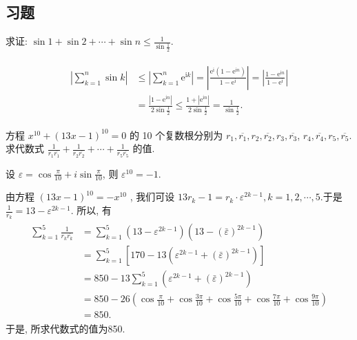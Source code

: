 \subsection{习题}
\begin{exercise}
	求证: $\sin 1+\sin 2+\cdots+\sin n \leqslant \frac{1}{\sin \frac{1}{2}}$.
\end{exercise}
\begin{solution}
	\begin{align*}
		\begin{aligned}
			\left|\sum_{k=1}^n \sin k\right| & \leqslant\left|\sum_{k=1}^n \mathrm{e}^{\mathrm{i} k}\right|=\left|\frac{\mathrm{e}^{\mathrm{i}}\left(1-\mathrm{e}^{\mathrm{i} n}\right)}{1-\mathrm{e}^{\mathrm{i}}}\right|=\left|\frac{1-\mathrm{e}^{\mathrm{i} n}}{1-\mathrm{e}^{\mathrm{i}}}\right| \\
			                                 & =\frac{\left|1-\mathrm{e}^{\mathrm{i} n}\right|}{2 \sin \frac{1}{2}} \leqslant \frac{1+\left|\mathrm{e}^{\mathrm{i} n}\right|}{2 \sin \frac{1}{2}}=\frac{1}{\sin \frac{1}{2}} .
		\end{aligned}
	\end{align*}
\end{solution}

\begin{exercise}
	方程 $x^{10}+(13 x-1)^{10}=0$ 的 10 个复数根分别为 $r_1, \overline{r_1}, r_2, \overline{r_2}, r_3, \overline{r_3}$, $r_4, \overline{r_4}, r_5, \overline{r_5}$. 求代数式 $\frac{1}{r_1 \overline{r_1}}+\frac{1}{r_2 \overline{r_2}}+\cdots+\frac{1}{r_5 \overline{r_5}}$ 的值.
\end{exercise}
\begin{solution}
	设 $\varepsilon=\cos \frac{\pi}{10}+i \sin \frac{\pi}{10}$, 则 $\varepsilon^{10}=-1$.

	由方程 $(13 x-1)^{10}=-x^{10}$ , 我们可设 $13 r_k-1=r_k \cdot \varepsilon^{2 k-1}, k=1,2, \cdots, 5$.于是 $\frac{1}{r_k}=13-\varepsilon^{2 k-1}$. 所以, 有
	\begin{align*}
		\begin{aligned}
			\sum_{k=1}^5 \frac{1}{r_k \overline{r_k}} & =\sum_{k=1}^5\left(13-\varepsilon^{2 k-1}\right)\left(13-(\bar{\varepsilon})^{2 k-1}\right)                                     \\
			                                          & =\sum_{k=1}^5\left[170-13\left(\varepsilon^{2 k-1}+(\bar{\varepsilon})^{2 k-1}\right)\right]                                    \\
			                                          & =850-13 \sum_{k=1}^5\left(\varepsilon^{2 k-1}+(\bar{\varepsilon})^{2 k-1}\right)                                                \\
			                                          & =850-26\left(\cos \frac{\pi}{10}+\cos \frac{3 \pi}{10}+\cos \frac{5 \pi}{10}+\cos \frac{7 \pi}{10}+\cos \frac{9 \pi}{10}\right) \\
			                                          & =850 .
		\end{aligned}
	\end{align*}
	于是, 所求代数式的值为850.
\end{solution}

